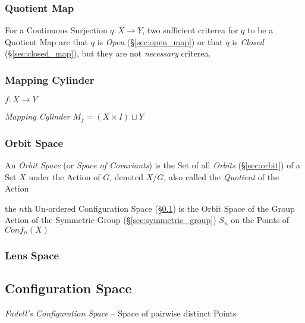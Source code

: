 \subsubsection{Quotient Map}\label{sec:quotient_map}

For a Continuous Surjection $q : X \rightarrow Y$, two sufficient criterea for
$q$ to be a Quotient Map are that $q$ is \emph{Open} (\S\ref{sec:open_map}) or
that $q$ is \emph{Closed} (\S\ref{sec:closed_map}), but they are not
\emph{necessary} criterea.



\subsubsection{Mapping Cylinder}\label{sec:mapping_cylinder}

$f : X \rightarrow Y$

\emph{Mapping Cylinder} $M_f = (X \times I) \sqcup Y$



\subsubsection{Orbit Space}\label{sec:orbit_space}

An \emph{Orbit Space} (or \emph{Space of Covariants}) is the Set of all
\emph{Orbits} (\S\ref{sec:orbit}) of a Set $X$ under the Action of $G$, denoted
$X / G$, also called the \emph{Quotient} of the Action

the $n$th Un-ordered Configuration Space (\S\ref{sec:configuration_space}) is
the Orbit Space of the Group Action of the Symmetric Group
(\S\ref{sec:symmetric_group}) $S_n$ on the Points of $Conf_n(X)$



\subsubsection{Lens Space}\label{sec:lens_space}



\subsection{Configuration Space}\label{sec:configuration_space}

\emph{Fadell's Configuration Space} -- Space of pairwise distinct Points

